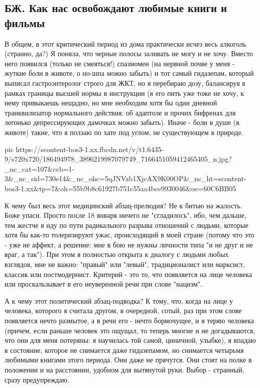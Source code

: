  
 
 
 
 
\subsection{БЖ. Как нас освобождают любимые книги и фильмы}

В общем, в этот критический период из дома практически исчез весь алкоголь
(странно, да?) Я поняла, что черные полосы заливать не могу и не хочу. Вместо
него появился (только не смеяться!) спазмомен (на нервной почве у меня - жуткие
боли в животе, о но-шпа можно забыть) и тот самый гидазепам, который выписал
гастроэнтеролог строго для ЖКТ, но я перебираю дозу, балансируя в рамках
границы высшей нормы в инструкции (я его пить уже тоже не хочу, к нему
привыкаешь нещадно, но мне необходим хотя бы один дневной транквилизатор
нормального действия: об адаптоле и прочих бифренах для легонько депрессирующих
дамочках можно забыть). Иначе - боли в душе (в животе) такие, что я ползаю по
хате под углом, не существующем в природе. 

\ifcmt
  pic https://scontent-bos3-1.xx.fbcdn.net/v/t1.6435-9/s720x720/186494978_3896219987079749_7166451059412465405_n.jpg?_nc_cat=107&ccb=1-3&_nc_sid=730e14&_nc_ohc=5qJNVzb1XjcAX9K00OP&_nc_ht=scontent-bos3-1.xx&tp=7&oh=55b9b8c61927b751c55aa4bce9930046&oe=60C6BB05
\fi

К чему был весь этот медицинский абзац-прелюдия? Не к битью на жалость. Боже
упаси. Просто после 18 января ничего не "сгладилось", ибо, чем дальше, тем
жестче я иду по пути радикального разрыва отношений с людьми, которые хотя бы
как-то толеризируют ужас, происходящий в моей стране (потому что это - уже не
аффект, а решение: мне в бою не нужны личности типа "и не друг и не враг, а
так"). При этом я полностью открыта к диалогу с людьми любых взглядов, мне не
важно: "правый" или "левый", традиционалист или марксист, классик или
постмодернист. Критерий - это то, что появляется на лице человека или
проскальзывает в его неуверенной речи при слове "нацизм". 

А к чему этот политический абзац-подводка? К тому, что, когда на лице у
человека, которого я считала другом, в очередной, сотый, раз при этом слове
появляется нечто размытое, а в речи его - нечто бормочущее, и я теряю человека
(причем, если раньше человек это ощущал, то теперь многие и не догадываются,
что они для меня потеряны: я научилась той самой, циничной, улыбке), я впадаю в
состояние, которое не снимается даже гидазепамом, но снимается четырьмя
любимыми книгами этого периода. Они даже не прячутся. Они стоят на полке в
положении и на расстоянии, удобном для вытянутой руки. Выбор - странный, сразу
предупреждаю. 

